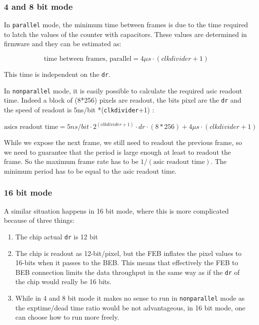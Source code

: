 \documentclass{article}
\begin{document}
{{{\subsubsection{4 and 8 bit mode}
In {\tt{parallel}} mode, the minimum time between frames is due to the time required to latch the values of the counter with capacitors. These values are determined in firmware and they can be estimated as:

\begin{equation} \label{dtparallel}
\textrm{time between frames, parallel} = 4 \mu s \cdot (clkdivider+1)
\end{equation}

This time is independent on the {\tt{dr}}.

In {\tt{nonparallel}} mode, it is easily possible to calculate the required asic readout time. 
Indeed a block of (8*256) pixels are readout, the bits pixel are the {\tt{dr}} and the speed of readout is 5ns/bit *({\tt{clkdivider}}+1) : 

\begin{equation}\label{dtnonparallel}
\textrm{asics readout time} = 5ns/bit \cdot 2^{(clkdivider+1)} \cdot dr \cdot (8*256) + 4 \mu s \cdot (clkdivider+1)
\end{equation}

While we expose the next frame, we still need to readout the previous frame, so we need to guarantee that the period is large enough at least to readout the frame. So the maximum frame rate has to be $1/(\textrm{asic readout time})$. The minimum period has to be equal to the asic readout time. 

\subsubsection{16 bit mode}

A similar situation happens in 16 bit mode, where this is more complicated because of three things:
\begin{enumerate}
\item The chip actual {\tt{dr}} is 12 bit
\item The chip is readout as 12-bit/pixel, but the FEB inflates the pixel values to 16-bits when it passes to the BEB. This means that effectively the FEB to BEB connection limits the data throughput in the same way as if the {\tt{dr}} of the chip would really be 16 bits.
\item While in 4 and 8 bit mode it makes no sense to run in {\tt{nonparallel}} mode as the exptime/dead time ratio would be not advantageous, in 16 bit mode, one can choose how to run more freely.
\end{enumerate}

}}}
\end{document}
